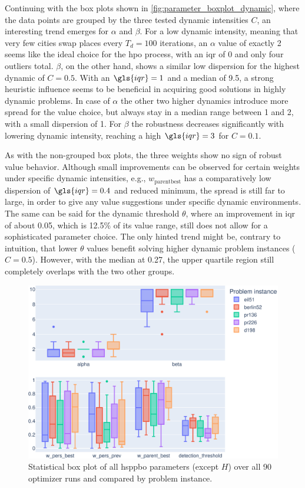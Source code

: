 Continuing with the box plots shown in \cref{fig:parameter_boxplot_dynamic}, where the data points are grouped by the three tested dynamic intensities $C$, an interesting trend emerges for $\alpha$ and $\beta$. For a low dynamic intensity, meaning that very few cities swap places every $T_d = 100$ iterations, an $\alpha$ value of exactly 2 seems like the ideal choice for the \gls{hpo} process, with an \gls{iqr} of 0 and only four outliers total. $\beta$, on the other hand, shows a similar low dispersion for the highest dynamic of $C = 0.5$. With an $\gls{iqr} = 1$ and a median of 9.5, a strong heuristic influence seems to be beneficial in acquiring good solutions in highly dynamic problems. In case of $\alpha$ the other two higher dynamics introduce more spread for the value choice, but always stay in a median range between 1 and 2, with a small dispersion of 1. For $\beta$ the robustness decreases significantly with lowering dynamic intensity, reaching a high $\gls{iqr} = 3$ for $C = 0.1$.

As with the non-grouped box plots, the three weights show no sign of robust value behavior. Although small improvements can be observed for certain weights under specific dynamic intensities, e.g., $w_{\text{parentbest}}$ has a comparatively low dispersion of $\gls{iqr} = 0.4$ and reduced minimum, the spread is still far to large, in order to give any value suggestions under specific dynamic environments. The same can be said for the dynamic threshold $\theta$, where an improvement in \gls{iqr} of about 0.05, which is 12.5\% of its value range, still does not allow for a sophisticated parameter choice. The only hinted trend might be, contrary to intuition, that lower $\theta$ values benefit solving higher dynamic problem instances ($C=0.5$). However, with the median at 0.27, the upper quartile region still completely overlaps with the two other groups.

\begin{figure}[h]
	\centering
	\includegraphics[width=\textwidth]{results/part2/parameter_boxplot_problem.svg}
	\caption[Statistical box plot of \gls{hsppbo} parameters compared by problem instance]{Statistical box plot of all \gls{hsppbo} parameters (except $H$) over all 90 optimizer runs and compared by problem instance.}
	\label{fig:parameter_boxplot_problem}
\end{figure}

